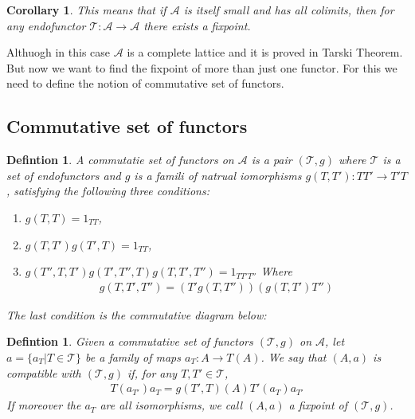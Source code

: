 \documentclass[12pt]{article}
\newcounter{the}
\newtheorem{definition}[the]{Defintion}
\newtheorem{corollary}[the]{Corollary}
\begin{document}
\begin{corollary}
    This means that if $\mathscr A$ is itself small and has all colimits, then for any endofunctor $\mathscr T: \mathscr A \to \mathscr A$ there exists a fixpoint.
\end{corollary}

Althuogh in this case $\mathscr A$ is a complete lattice and it is proved in Tarski Theorem. But now we want to find the fixpoint of more than just one functor. For this we need to define the notion of commutative set of functors.

\subsection*{Commutative set of functors}
\begin{definition}
    A commutatie set of functors on $\mathscr A$ is a pair $(\mathscr T, g)$ where $\mathscr T$ is a set of endofunctors and $g$ is a famili of natrual iomorphisms $g(T, T'): TT' \to T'T$, satisfying the following three conditions:
    \begin{enumerate}
        \item $g(T, T) = 1_{TT}$,
        \item $g(T, T') g(T', T) = 1_{TT}$,
        \item $g(T'', T, T') g(T', T'', T) g(T, T', T'') = 1_{TT'T''}$ 
            Where 
            \begin{gather*}
                g(T, T', T'') = (T' g(T, T''))(g(T, T')T'')
            \end{gather*}
    \end{enumerate}
    The last condition is the commutative diagram below:
    \begin{center}
    \end{center}
\end{definition}


\begin{definition}
    Given a commutative set of functors $(\mathscr T, g)$ on $\mathscr A$, let $a = \{a_T | T \in \mathscr T \}$ be a family of maps $a_T: A \to T(A)$. We say that $(A, a)$ is compatible with $(\mathscr{T}, g)$ if, for any $T, T' \in \mathscr T$,
    \begin{gather*}
        T(a_{T'}) a_T = g(T', T) (A) T' (a_T) a_{T'}
    \end{gather*}
    If moreover the $a_T$ are all isomorphisms, we call $(A, a)$ a fixpoint of $(\mathscr T, g)$.
\end{definition}
\end{document}
